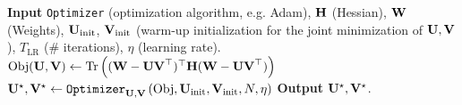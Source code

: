 \begin{algorithm}[h]
    \caption{\texttt{Low-Rank-GD}
    }
    \label{algo:low-rank-gd}
    \begin{algorithmic}[]
        \State \textbf{Input} \texttt{Optimizer} (optimization algorithm, e.g. Adam), $\mathbf{H}$ (Hessian), $\mathbf{W}$ (Weights), $\mathbf{U}_\text{init}$, $\mathbf{V}_\text{init}$ (warm-up initialization for the joint minimization of $\mathbf{U}, \mathbf{V}$), $T_{\text{LR}}$ (\# iterations), $\eta$ (learning rate).
        \State $\text{Obj}(\mathbf{U}, \mathbf{V}) \gets \operatorname{Tr}\left({({\mathbf{W} - \mathbf{UV}^\top})^\top \mathbf{H} ({\mathbf{W} - \mathbf{UV}^\top})}\right)$        \vspace*{0.4em}
        \State $\mathbf{U}^\star, \mathbf{V}^\star \gets \texttt{Optimizer}_{\mathbf{U}, \mathbf{V}}\left({\text{Obj}, \mathbf{U}_\text{init}, \mathbf{V}_\text{init}, N, \eta}\right)$
        \vspace*{0.4em}
        \State \textbf{Output} $\mathbf{U}^\star, \mathbf{V}^\star$.
    \end{algorithmic}
\end{algorithm}
\vspace{-\baselineskip}
